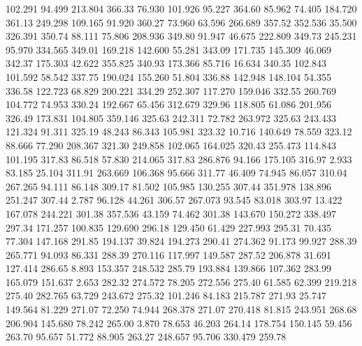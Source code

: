  102.291   94.499  213.804       366.33
  76.930  101.926   95.227       364.60
  85.962   74.405  184.720       361.13
 249.298  109.165   91.920       360.27
  73.960   63.596  266.689       357.52
 352.536   35.500  326.391       350.74
  88.111   75.806  208.936       349.80
  91.947   46.675  222.809       349.73
 245.231   95.970  334.565       349.01
 169.218  142.600   55.281       343.09
 171.735  145.309   46.069       342.37
 175.303   42.622  355.825       340.93
 173.366   85.716   16.634       340.35
 102.843  101.592   58.542       337.75
 190.024  155.260   51.804       336.88
 142.948  148.104   54.355       336.58
 122.723   68.829  200.221       334.29
 252.307  117.270  159.046       332.55
 260.769  104.772   74.953       330.24
 192.667   65.456  312.679       329.96
 118.805   61.086  201.956       326.49
 173.831  104.805  359.146       325.63
 242.311   72.782  263.972       325.63
 243.433  121.324   91.311       325.19
  48.243   86.343  105.981       323.32
  10.716  140.649   78.559       323.12
  88.666   77.290  208.367       321.30
 249.858  102.065  164.025       320.43
 255.473  114.843  101.195       317.83
  86.518   57.830  214.065       317.83
 286.876   94.166  175.105       316.97
   2.933   83.185   25.104       311.91
 263.669  106.368   95.666       311.77
  46.409   74.945   86.057       310.04
 267.265   94.111   86.148       309.17
  81.502  105.985  130.255       307.44
 351.978  138.896  251.247       307.44
   2.787   96.128   44.261       306.57
 267.073   93.545   83.018       303.97
  13.422  167.078  244.221       301.38
 357.536   43.159   74.462       301.38
 143.670  150.272  338.497       297.34
 171.257  100.835  129.690       296.18
 129.450   61.429  227.993       295.31
  70.435   77.304  147.168       291.85
 194.137   39.824  194.273       290.41
 274.362   91.173   99.927       288.39
 265.771   94.093   86.331       288.39
 270.116  117.997  149.587       287.52
 206.878   31.691  127.414       286.65
   8.893  153.357  248.532       285.79
 193.884  139.866  107.362       283.99
 165.079  151.637    2.653       282.32
 274.572   78.205  272.556       275.40
  61.585   62.399  219.218       275.40
 282.765   63.729  243.672       275.32
 101.246   84.183  215.787       271.93
  25.747  149.564   81.229       271.07
  72.250   74.944  268.378       271.07
 270.418   81.815  243.951       268.68
 206.904  145.680   78.242       265.00
   3.870   78.653   46.203       264.14
 178.754  150.145   59.456       263.70
  95.657   51.772   88.905       263.27
 248.657   95.706  330.479       259.78
